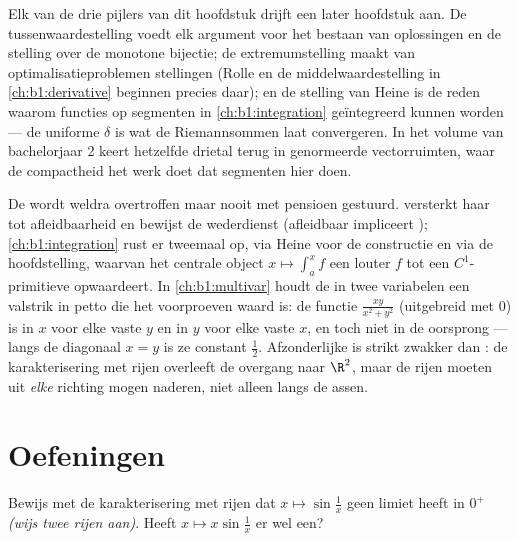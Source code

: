 \begin{remark}
Elk van de drie pijlers van dit hoofdstuk drijft een later hoofdstuk aan.
De tussenwaardestelling voedt elk argument voor het bestaan van
oplossingen en de stelling over de monotone bijectie; de extremumstelling
maakt van optimalisatieproblemen stellingen (Rolle en de
middelwaardestelling in \cref{ch:b1:derivative} beginnen precies daar);
en de stelling van Heine is de reden waarom  functies op
segmenten in \cref{ch:b1:integration} geïntegreerd kunnen worden --- de
uniforme $\delta$ is wat de Riemannsommen laat convergeren. In het volume
van bachelorjaar 2 keert hetzelfde drietal terug in genormeerde
vectorruimten, waar de compactheid het werk doet dat segmenten hier doen.
\end{remark}

\begin{remark}
De  wordt weldra overtroffen maar nooit met pensioen
gestuurd.  versterkt haar tot afleidbaarheid en
bewijst de wederdienst (afleidbaar impliceert );
\cref{ch:b1:integration} rust er tweemaal op, via Heine voor de
constructie en via de hoofdstelling, waarvan het centrale object $x
\mapsto \int_a^x f$ een louter  $f$ tot een $C^1$-primitieve
opwaardeert. In \cref{ch:b1:multivar} houdt de  in twee
variabelen een valstrik in petto die het voorproeven waard is: de functie
$\frac{xy}{x^2 + y^2}$ (uitgebreid met $0$) is  in $x$ voor elke
vaste $y$ en in $y$ voor elke vaste $x$, en toch niet  in de
oorsprong --- langs de diagonaal $x = y$ is ze constant $\frac12$.
Afzonderlijke  is strikt zwakker dan : de
karakterisering met rijen overleeft de overgang naar $\R^2$, maar de
rijen moeten uit \emph{elke} richting mogen naderen, niet alleen langs de
assen.
\end{remark}

\section{Oefeningen}

\begin{exercise}[$\star$]\label{exo:b1:continuity:1}
Bewijs met de karakterisering met rijen dat $x \mapsto \sin\frac 1x$ geen
limiet heeft in $0^+$ \emph{(wijs twee rijen aan)}. Heeft $x \mapsto x
\sin\frac 1x$ er wel een?
\end{exercise}

